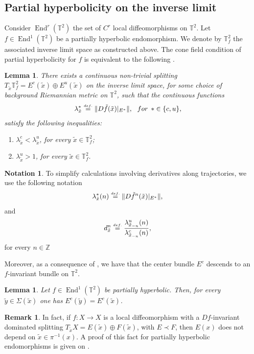 \documentclass[a4paper,11pt,reqno]{amsart}
\newcommand{\Z}{{\mathbb Z}}
\newcommand{\TT}{{\mathbb{T}^2}}
\newcommand{\TTf}{{\mathbb{T}_f^2}}
\newcommand{\eqdef}{\stackrel{\scriptscriptstyle\textrm def.}{=}}
\newcommand{\tix}{\tilde{x}}
\newcommand{\tif}{\tilde{f}}
\newtheorem{lemma}[theorem]{Lemma}
\theoremstyle{definition}
\newtheorem{remark}{Remark}
\newtheorem*{notation}{Notation}
\begin{document}
\subsection{Partial hyperbolicity on the inverse limit}
Consider $\operatorname{End}^r(\TT)$ the set of $C^r$ local diffeomorphisms on $\TT$. Let $f\in\operatorname{End}^1(\TT)$ be a partially hyperbolic endomorphism. We denote by $\TTf$ the associated inverse limit space as constructed above. The cone field condition of partial hyperbolicity for $f$ is equivalent to the following \cite{QXZ2009,HirschPughShub}.

\begin{lemma}
    \label{lem:defideph}
There exists a continuous non-trivial splitting  $T_{\tix}\TTf=E^c(\tix)\oplus E^u(\tix)$ on the inverse limit space, for some choice of background Riemannian metric on $\TT$, such that the continuous functions
\[
\lambda^{*}_{\tix}\eqdef\|D\tilde{f}(\tix)|_{E^{*}}\|,\:\:\:\textrm{for}\:\: * \in \{c,u\},
\]
satisfy the following inequalities:
\begin{enumerate}
\item$\lambda^c_{\tix}<\lambda^u_{\tix}$, for every $\tix\in\TTf$;
\item  $\lambda^u_{\tix}>1$, for  every $\tix\in\TTf$.
\end{enumerate}
\end{lemma}

\begin{notation}
    To simplify calculations involving derivatives along trajectories, we use the following notation
    \[
    \lambda^{*}_{\tix}(n)\eqdef\|D\tif^n(\tix)|_{E^{*}}\|,
    \]
    and 
    \[
    d^{n}_{\tix}\eqdef\frac{\lambda^u_{\tix_{-n}}(n)}{\lambda^c_{\tix_{-n}}(n)},
    \]
    for every $n\in\Z$
\end{notation}

Moreover, as a consequence of \cite{CostaMicena2022}, we have that the center bundle $E^c$ descends to an $f$-invariant bundle on $\TT$.

\begin{lemma}
    \label{lem:centralcte}
Let $f\in\operatorname{End}^1(\TT)$ be partially hyperbolic. Then, for every $\tilde{y}\in\Sigma(\tix)$ one has $E^c(\tilde{y})=E^c(\tix)$.
\end{lemma}

\begin{remark}
	\label{rem:uniq-c}
	In fact, if $f: X \to X$ is a local diffeomorphism with a $Df$-invariant dominated splitting $T_{\tilde{x}}X = E(\tilde{x}) \oplus F(\tilde{x})$, with $E \prec F$, then $E(x)$ does not depend on $\tilde{x} \in \pi^{-1}(x)$. A proof of this fact for partially hyperbolic endomorphisms is given on \cite[Lemma 2.5]{CostaMicena2022}.
\end{remark}
\end{document}
